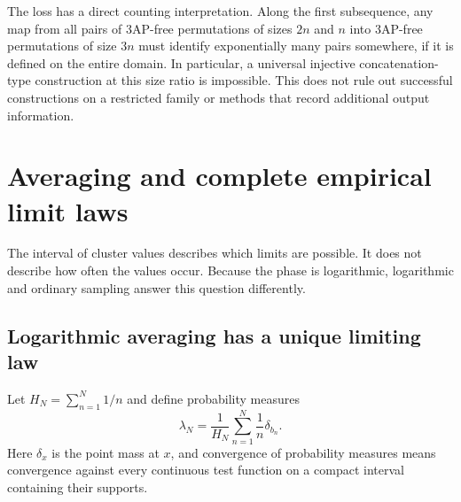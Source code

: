 \documentclass[11pt,a4paper]{article}
\numberwithin{equation}{section}
\theoremstyle{definition}
\theoremstyle{remark}
\theoremstyle{definition}
\theoremstyle{plain}
\begin{document}
The loss has a direct counting interpretation. Along the first subsequence,
any map from all pairs of 3AP-free permutations of sizes $2n$ and $n$ into
3AP-free permutations of size $3n$ must identify exponentially many pairs
somewhere, if it is defined on the entire domain. In particular, a universal
injective concatenation-type construction at this size ratio is impossible.
This does not rule out successful constructions on a restricted family or
methods that record additional output information.

\section{Averaging and complete empirical limit laws}
\label{dsr:sec:statistics}
The interval of cluster values describes which limits are possible. It does
not describe how often the values occur. Because the phase is logarithmic,
logarithmic and ordinary sampling answer this question differently.

\subsection{Logarithmic averaging has a unique limiting law}
Let $H_N=\sum_{n=1}^N1/n$ and define probability measures
\begin{equation}
 \lambda_N=\frac1{H_N}\sum_{n=1}^N\frac1n\delta_{b_n}.
\end{equation}
Here $\delta_x$ is the point mass at $x$, and convergence of probability
measures means convergence against every continuous test function on a
compact interval containing their supports.
\end{document}
